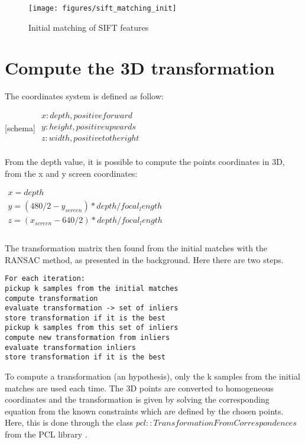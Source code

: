 \begin{figure}[h]
\centering
\texttt{[image: figures/sift\_matching\_init]}
\caption{Initial matching of SIFT features}
\end{figure}

\section{Compute the 3D transformation}

The coordinates system is defined as follow:

[schema]
\(
\begin{array}{l}
x: depth, positive forward\\
y: height, positive upwards\\
z: width, positive to the right\\
\end{array}
\)

From the depth value, it is possible to compute the points coordinates in 3D, from the x and y screen coordinates:

\(
\begin{array}{l}
x = depth \\
y = (480/2 - y_{screen}) * depth / focal_length \\
z = (x_{screen} - 640/2) * depth / focal_length \\
\end{array}
\)

\paragraph{}
The transformation matrix then found from the initial matches with the RANSAC method, as presented in the background. Here there are two steps.

\begin{verbatim}
For each iteration:
pickup k samples from the initial matches
compute transformation
evaluate transformation -> set of inliers
store transformation if it is the best
pickup k samples from this set of inliers
compute new transformation from inliers
evaluate transformation inliers
store transformation if it is the best
\end{verbatim}

To compute a transformation (an hypothesis), only the k samples from the initial matches are used each time. The 3D points are converted to homogeneous coordinates and the transformation is given by solving the corresponding equation from the known constraints which are defined by the chosen points. Here, this is done through the class $pcl::TransformationFromCorrespondences$ from the PCL library \cite{Rusu_ICRA2011_PCL}.

